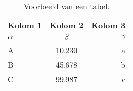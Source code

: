 \lipsum[7-20]

\begin{table}
  \centering
  \begin{tabular}{lcr}
    \toprule
    \textbf{Kolom 1} & \textbf{Kolom 2} & \textbf{Kolom 3} \\
    $\alpha$         & $\beta$          & $\gamma$         \\
    \midrule
    A                & 10.230           & a                \\
    B                & 45.678           & b                \\
    C                & 99.987           & c                \\
    \bottomrule
  \end{tabular}
  \caption[Voorbeeld tabel]{\label{tab:example}Voorbeeld van een tabel.}
\end{table}

